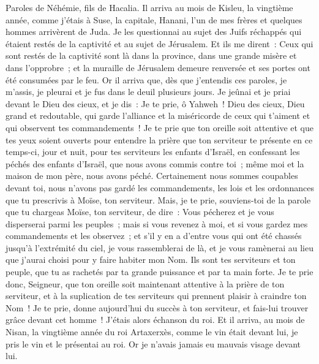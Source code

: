 \begin{multicols}{2}
\VerseOne{}Paroles de Néhémie, fils de Hacalia. Il arriva au mois de Kisleu, la vingtième année, comme j'étais à Suse, la capitale,
Hanani, l'un de mes frères et quelques hommes arrivèrent de Juda. Je les questionnai au sujet des Juifs réchappés qui étaient restés de la captivité et au sujet de Jérusalem.
Et ils me dirent~: Ceux qui sont restés de la captivité sont là dans la province, dans une grande misère et dans l'opprobre~; et la muraille de Jérusalem demeure renversée et ses portes ont été consumées par le feu.
Or il arriva que, dès que j'entendis ces paroles, je m'assis, je pleurai et je fus dans le deuil plusieurs jours. Je jeûnai et je priai devant le Dieu des cieux,
 et je dis~: Je te prie, ô Yahweh~! Dieu des cieux, Dieu grand et redoutable, qui garde l'alliance et la miséricorde de ceux qui t'aiment et qui observent tes commandements~!
Je te prie que ton oreille soit attentive et que tes yeux soient ouverts pour entendre la prière que ton serviteur te présente en ce temps-ci, jour et nuit, pour tes serviteurs les enfants d'Israël, en confessant les péchés des enfants d'Israël, que nous avons commis contre toi~; même moi et la maison de mon père, nous avons péché.
Certainement nous sommes coupables devant toi, nous n'avons pas gardé les commandements, les lois et les ordonnances que tu prescrivis à Moïse, ton serviteur.
Mais, je te prie, souviens-toi de la parole que tu chargeas Moïse, ton serviteur, de dire~: Vous pécherez et je vous disperserai parmi les peuples~;
mais si vous revenez à moi, et si vous gardez mes commandements et les observez~; et s'il y en a d'entre vous qui ont été chassés jusqu'à l'extrémité du ciel, je vous rassemblerai de là, et je vous ramènerai au lieu que j'aurai choisi pour y faire habiter mon Nom.
Ils sont tes serviteurs et ton peuple, que tu as rachetés par ta grande puissance et par ta main forte.
Je te prie donc, Seigneur, que ton oreille soit maintenant attentive à la prière de ton serviteur, et à la suplication de tes serviteurs qui prennent plaisir à craindre ton Nom~! Je te prie, donne aujourd'hui du succès à ton serviteur, et fais-lui trouver grâce devant cet homme~! J'étais alors échanson du roi.
\VerseOne{}Et il arriva, au mois de Nisan, la vingtième année du roi Artaxerxès, comme le vin était devant lui, je pris le vin et le présentai au roi. Or je n'avais jamais eu mauvais visage devant lui.

\end{multicols}
